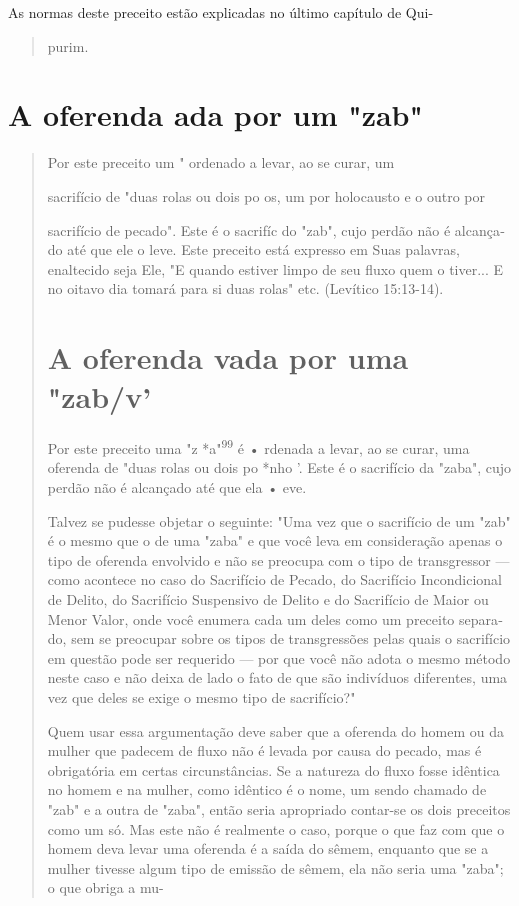 As normas deste preceito estão explicadas no último capítulo de Qui-

\begin{quote}
purim.
\end{quote}

\section{A oferenda ada por um "zab"}

\begin{quote}
Por este preceito um " ordenado a levar, ao se curar, um

sacrifício de "duas rolas ou dois po os, um por holocausto e o outro por

sacrifício de pecado". Este é o sacrifíc do "zab", cujo perdão não é
alcança­do até que ele o leve. Este preceito está expresso em Suas
palavras, enaltecido seja Ele, "E quando estiver limpo de seu fluxo quem
o tiver... E no oitavo dia tomará para si duas rolas" etc. (Levítico
15:13-14).

\section{A oferenda vada por uma "zab/v'}

Por este preceito uma "z *a"\textsuperscript{99} é • rdenada a levar, ao
se curar, uma oferenda de "duas rolas ou dois po *nho '. Este é o
sacrifício da "zaba", cu­jo perdão não é alcançado até que ela • eve.

Talvez se pudesse objetar o seguinte: "Uma vez que o sacrifício de um
"zab" é o mesmo que o de uma "zaba" e que você leva em consideração
apenas o tipo de oferenda envolvido e não se preocupa com o tipo de
trans­gressor --- como acontece no caso do Sacrifício de Pecado, do
Sacrifício Incon­dicional de Delito, do Sacrifício Suspensivo de Delito
e do Sacrifício de Maior ou Menor Valor, onde você enumera cada um deles
como um preceito separa­do, sem se preocupar sobre os tipos de
transgressões pelas quais o sacrifício em questão pode ser requerido ---
por que você não adota o mesmo método neste caso e não deixa de lado o
fato de que são indivíduos diferentes, uma vez que deles se exige o
mesmo tipo de sacrifício?"

Quem usar essa argumentação deve saber que a oferenda do homem ou da
mulher que padecem de fluxo não é levada por causa do pecado, mas é
obrigatória em certas circunstâncias. Se a natureza do fluxo fosse
idêntica no homem e na mulher, como idêntico é o nome, um sendo chamado
de "zab" e a outra de "zaba", então seria apropriado contar-se os dois
preceitos como um só. Mas este não é realmente o caso, porque o que faz
com que o homem deva levar uma oferenda é a saída do sêmem, enquanto que
se a mulher tivesse algum tipo de emissão de sêmem, ela não seria uma
"zaba"; o que obriga a mu-
\end{quote}

